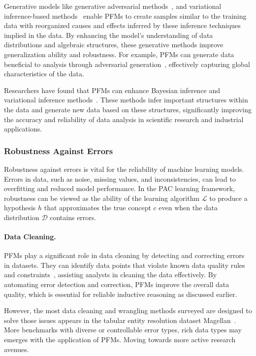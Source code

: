   Generative models like generative adversarial methods~\cite{Loem2023SAIEFS}, and variational inference-based methods~\cite{huamortizing} enable PFMs to create samples similar to the training data with reorganized causes and effects inferred by these inference techniques implied in the data. By enhancing the model's understanding of data distributions and algebraic structures, these generative methods improve generalization ability and robustness. For example, PFMs can generate data beneficial to analysis through adversarial generation~\cite{du2024enhancing,weng2023g}, effectively capturing global characteristics of the data.
  
  Researchers have found that PFMs can enhance Bay\-esian inference and variational inference methods~\cite{huamortizing}. These methods infer important structures within the data and generate new data based on these structures, significantly improving the accuracy and reliability of data analysis in scientific research and industrial applications.
  
  \subsubsection{Robustness Against Errors}\label{sec:robustness}
  
  Robustness against errors is vital for the reliability of machine learning models. Errors in data, such as noise, missing values, and inconsistencies, can lead to overfitting and reduced model performance. In the PAC learning framework, robustness can be viewed as the ability of the learning algorithm $\mathcal{L}$ to produce a hypothesis $h$ that approximates the true concept $c$ even when the data distribution $\mathcal{D}$ contains errors.
  
  \paragraph{Data Cleaning.}
  
  PFMs play a significant role in data cleaning by detecting and correcting errors in datasets. They can identify data points that violate known data quality rules and constraints~\cite{li2024towards}, assisting analysts in cleaning the data effectively. By automating error detection and correction, PFMs improve the overall data quality, which is essential for reliable inductive reasoning as discussed earlier. 

  However, the most data cleaning and wrangling methods surveyed are designed to solve those issues appears in the tabular entity resolution dataset Magellan~\cite{YanWWML24, ACSV, ni2024iterclean,ZeroED,huh2023pool, li2024table,zhang2024jellyfish,vos2022towards}. More benchmarks with diverse or controllable error types, rich data types may emerges with the application of PFMs. Moving towards more active research avenues.
  
